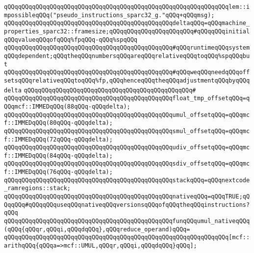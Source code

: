 \verb|qQQqqQQqqQQqqQQqqQQqqQQqqQQqqQQqqQQqqQQqqQQqqQQqqQQqqQQqqQQqqQQqlem::impossibleqQQq("pseudo_instructions_sparc32_g."qQQq+qQQqmsg);|\newline
\newline
\verb|qQQqqQQqqQQqqQQqqQQqqQQqqQQqqQQqqQQqqQQqqQQqqQQqdeltaqQQq=qQQqmachine_properties_sparc32::framesize;qQQqqQQqqQQqqQQqqQQqqQQq#qQQqqQQqinitialqQQqvalueqQQqofqQQq%fpqQQq-qQQq%spqQQq|\newline
\newline
\verb|qQQqqQQqqQQqqQQqqQQqqQQqqQQqqQQqqQQqqQQqqQQqqQQq#qQQqruntimeqQQqsystemqQQqdependent;qQQqtheqQQqnumbersqQQqareqQQqrelativeqQQqtoqQQq%spqQQqbut|\newline
\verb|qQQqqQQqqQQqqQQqqQQqqQQqqQQqqQQqqQQqqQQqqQQqqQQq#qQQqweqQQqneedqQQqoffsetsqQQqrelativeqQQqtoqQQq%fp,qQQqhenceqQQqtheqQQqadjustmentqQQqbyqQQqdelta|\newline
\verb|qQQqqQQqqQQqqQQqqQQqqQQqqQQqqQQqqQQqqQQqqQQqqQQq#|\newline
\verb|qQQqqQQqqQQqqQQqqQQqqQQqqQQqqQQqqQQqqQQqqQQqqQQqfloat_tmp_offsetqQQq=qQQqmcf::IMMEDqQQq(88qQQq-qQQqdelta);|\newline
\verb|qQQqqQQqqQQqqQQqqQQqqQQqqQQqqQQqqQQqqQQqqQQqqQQqumul_offsetqQQq=qQQqmcf::IMMEDqQQq(80qQQq-qQQqdelta);|\newline
\verb|qQQqqQQqqQQqqQQqqQQqqQQqqQQqqQQqqQQqqQQqqQQqqQQqsmul_offsetqQQq=qQQqmcf::IMMEDqQQq(72qQQq-qQQqdelta);|\newline
\verb|qQQqqQQqqQQqqQQqqQQqqQQqqQQqqQQqqQQqqQQqqQQqqQQqudiv_offsetqQQq=qQQqmcf::IMMEDqQQq(84qQQq-qQQqdelta);|\newline
\verb|qQQqqQQqqQQqqQQqqQQqqQQqqQQqqQQqqQQqqQQqqQQqqQQqsdiv_offsetqQQq=qQQqmcf::IMMEDqQQq(76qQQq-qQQqdelta);|\newline
\newline
\verb|qQQqqQQqqQQqqQQqqQQqqQQqqQQqqQQqqQQqqQQqqQQqqQQqstackqQQq=qQQqnextcode_ramregions::stack;|\newline
\newline
\verb|qQQqqQQqqQQqqQQqqQQqqQQqqQQqqQQqqQQqqQQqqQQqqQQqnativeqQQq=qQQqTRUE;qQQqqQQq#qQQqqQQquseqQQqnativeqQQqversionsqQQqofqQQqtheqQQqinstructions?qQQq|\newline
\newline
\verb|qQQqqQQqqQQqqQQqqQQqqQQqqQQqqQQqqQQqqQQqqQQqqQQqfunqQQqumul_nativeqQQq(qQQq{qQQqr,qQQqi,qQQqdqQQq},qQQqreduce_operand)qQQq=|\newline
\verb|qQQqqQQqqQQqqQQqqQQqqQQqqQQqqQQqqQQqqQQqqQQqqQQqqQQqqQQqqQQqqQQq[mcf::arithqQQq{qQQqa=>mcf::UMUL,qQQqr,qQQqi,qQQqdqQQq}qQQq];|\newline
